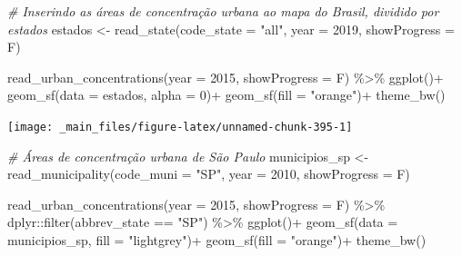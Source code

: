 \documentclass[
  brazilian,
]{book}
\newenvironment{Shaded}{\begin{snugshade}}{\end{snugshade}}
\newcommand{\AttributeTok}[1]{\textcolor[rgb]{0.77,0.63,0.00}{#1}}
\newcommand{\CommentTok}[1]{\textcolor[rgb]{0.56,0.35,0.01}{\textit{#1}}}
\newcommand{\DecValTok}[1]{\textcolor[rgb]{0.00,0.00,0.81}{#1}}
\newcommand{\FunctionTok}[1]{\textcolor[rgb]{0.00,0.00,0.00}{#1}}
\newcommand{\NormalTok}[1]{#1}
\newcommand{\OtherTok}[1]{\textcolor[rgb]{0.56,0.35,0.01}{#1}}
\newcommand{\SpecialCharTok}[1]{\textcolor[rgb]{0.00,0.00,0.00}{#1}}
\newcommand{\StringTok}[1]{\textcolor[rgb]{0.31,0.60,0.02}{#1}}
\begin{document}
\begin{Shaded}
\begin{Highlighting}[]
\CommentTok{\# Inserindo as áreas de concentração urbana ao mapa do Brasil, dividido por estados}
\NormalTok{estados }\OtherTok{\textless{}{-}} \FunctionTok{read\_state}\NormalTok{(}\AttributeTok{code\_state =} \StringTok{"all"}\NormalTok{,}
                      \AttributeTok{year =} \DecValTok{2019}\NormalTok{,}
                      \AttributeTok{showProgress =}\NormalTok{ F)}


\FunctionTok{read\_urban\_concentrations}\NormalTok{(}\AttributeTok{year =} \DecValTok{2015}\NormalTok{,}
                          \AttributeTok{showProgress =}\NormalTok{ F) }\SpecialCharTok{\%\textgreater{}\%} 
  \FunctionTok{ggplot}\NormalTok{()}\SpecialCharTok{+}
  \FunctionTok{geom\_sf}\NormalTok{(}\AttributeTok{data =}\NormalTok{ estados, }\AttributeTok{alpha =} \DecValTok{0}\NormalTok{)}\SpecialCharTok{+}
  \FunctionTok{geom\_sf}\NormalTok{(}\AttributeTok{fill =} \StringTok{"orange"}\NormalTok{)}\SpecialCharTok{+}
  \FunctionTok{theme\_bw}\NormalTok{()}
\end{Highlighting}
\end{Shaded}

\begin{center}\texttt{[image: \_main\_files/figure-latex/unnamed-chunk-395-1]} \end{center}

\begin{Shaded}
\begin{Highlighting}[]
\CommentTok{\# Áreas de concentração urbana de São Paulo}
\NormalTok{municipios\_sp }\OtherTok{\textless{}{-}} \FunctionTok{read\_municipality}\NormalTok{(}\AttributeTok{code\_muni =} \StringTok{"SP"}\NormalTok{,}
                                   \AttributeTok{year =} \DecValTok{2010}\NormalTok{,}
                                   \AttributeTok{showProgress =}\NormalTok{ F)}

\FunctionTok{read\_urban\_concentrations}\NormalTok{(}\AttributeTok{year =} \DecValTok{2015}\NormalTok{,}
                          \AttributeTok{showProgress =}\NormalTok{ F) }\SpecialCharTok{\%\textgreater{}\%} 
\NormalTok{  dplyr}\SpecialCharTok{::}\FunctionTok{filter}\NormalTok{(abbrev\_state }\SpecialCharTok{==} \StringTok{"SP"}\NormalTok{) }\SpecialCharTok{\%\textgreater{}\%} 
  \FunctionTok{ggplot}\NormalTok{()}\SpecialCharTok{+}
  \FunctionTok{geom\_sf}\NormalTok{(}\AttributeTok{data =}\NormalTok{ municipios\_sp, }\AttributeTok{fill =} \StringTok{"lightgrey"}\NormalTok{)}\SpecialCharTok{+}
  \FunctionTok{geom\_sf}\NormalTok{(}\AttributeTok{fill =} \StringTok{"orange"}\NormalTok{)}\SpecialCharTok{+}
  \FunctionTok{theme\_bw}\NormalTok{()}
\end{Highlighting}
\end{Shaded}
\end{document}
